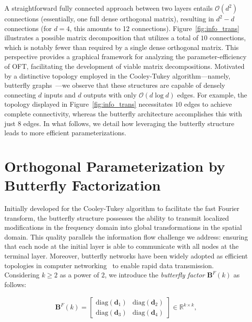 A straightforward fully connected approach between two layers entails $\mathcal{O}(d^2)$ connections (essentially, one full dense orthogonal matrix), resulting in $d^2 - d$ connections (for $d = 4$, this amounts to 12 connections). Figure~\ref{fig:info_trans} illustrates a possible matrix decomposition that utilizes a total of $10$ connections, which is notably fewer than required by a single dense orthogonal matrix. This perspective provides a graphical framework for analyzing the parameter-efficiency of OFT, facilitating the development of viable matrix decompositions. Motivated by a distinctive topology employed in the Cooley-Tukey algorithm—namely, butterfly graphs~\cite{cooley1965algorithm}—we observe that these structures are capable of densely connecting $d$ inputs and $d$ outputs with only $\mathcal{O}(d\log d)$ edges. For example, the topology displayed in Figure~\ref{fig:info_trans} necessitates $10$ edges to achieve complete connectivity, whereas the butterfly architecture accomplishes this with just $8$ edges. In what follows, we detail how leveraging the butterfly structure leads to more efficient parameterizations.

\section{Orthogonal Parameterization by Butterfly Factorization}

Initially developed for the Cooley-Tukey algorithm to facilitate the fast Fourier transform, the butterfly structure possesses the ability to transmit localized modifications in the frequency domain into global transformations in the spatial domain. This quality parallels the information flow challenge we address: ensuring that each node at the initial layer is able to communicate with all nodes at the terminal layer. Moreover, butterfly networks have been widely adopted as efficient topologies in computer networking~\cite{solihin2015fundamentals,li2011linear} to enable rapid data transmission. Considering $k \geq 2$ as a power of $2$, we introduce the \emph{butterfly factor} $\bm{B}^F(k)$ as follows:

\begin{equation}\label{eq:but_factor}
\begin{aligned}
    \bm{B}^F(k) = \begin{bmatrix}
    \text{diag}(\bm{d}_1) & \text{diag}(\bm{d}_2) \\
    \text{diag}(\bm{d}_3) & \text{diag}(\bm{d}_4)
    \end{bmatrix} \in \mathbb{R}^{k \times k},
\end{aligned}
\end{equation}

